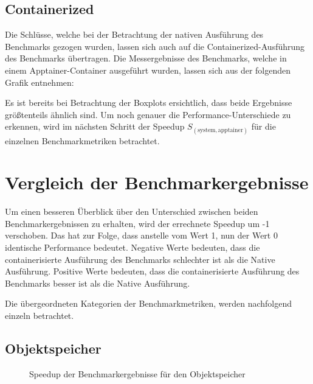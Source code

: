 \subsection{Containerized}

Die Schlüsse, welche bei der Betrachtung der nativen Ausführung des Benchmarks gezogen wurden, lassen sich auch auf die Containerized-Ausführung des Benchmarks übertragen. Die Messergebnisse des Benchmarks, welche in einem Apptainer-Container ausgeführt wurden, lassen sich aus der folgenden Grafik entnehmen:




Es ist bereits bei Betrachtung der Boxplots ersichtlich, dass beide Ergebnisse größtenteils ähnlich sind. Um noch genauer die Performance-Unterschiede zu erkennen, wird im nächsten Schritt der Speedup $S_(\text{system}, \text{apptainer})$ für die einzelnen Benchmarkmetriken betrachtet.

\pagebreak

\section{Vergleich der Benchmarkergebnisse}

Um einen besseren Überblick über den Unterschied zwischen beiden Benchmarkergebnissen zu erhalten, wird der errechnete Speedup um -1 verschoben. Das hat zur Folge, dass anstelle vom Wert 1, nun der Wert 0 identische Performance bedeutet. 
Negative Werte bedeuten, dass die containerisierte Ausführung des Benchmarks schlechter ist als die Native Ausführung. Positive Werte bedeuten, dass die containerisierte Ausführung des Benchmarks besser ist als die Native Ausführung. 

Die übergeordneten Kategorien der Benchmarkmetriken, werden nachfolgend einzeln betrachtet.

\subsection{Objektspeicher}

\begin{figure}[H]
    \centering
    
    \caption{Speedup der Benchmarkergebnisse für den Objektspeicher}
    \label{fig:speedup_object}
\end{figure}

\FloatBarrier

